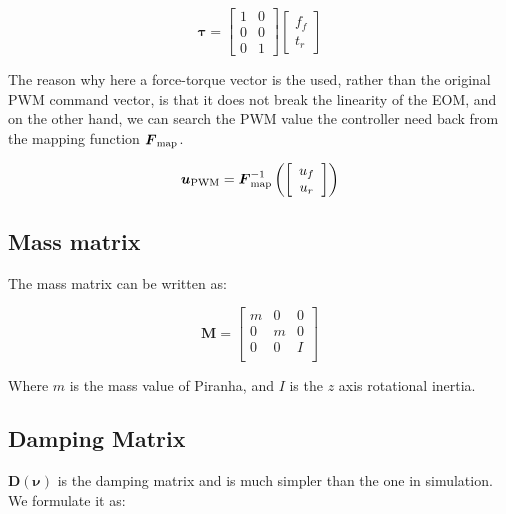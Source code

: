 \begin{equation}
    \boldsymbol{\tau}=\left[\begin{array}{cc}
        1 & 0 \\
        0 & 0\\
        0 & 1 
    \end{array}\right]\left[\begin{array}{c}
        f_f  \\
        t_r
    \end{array}\right]
\end{equation}

The reason why here a force-torque vector is the used, rather than the original PWM command vector, is that it does not break the linearity of the EOM, and on the other hand, we can search the PWM value the controller need back from the mapping function $\boldsymbol{F}_{\rm map}$. 

\begin{equation}
    \boldsymbol{u}_{\rm PWM}=\boldsymbol{F}_{\rm map}^{-1}\left(\left[\begin{array}{c}
        u_f  \\
        u_r
    \end{array}\right]\right)
\end{equation}

\subsection{Mass matrix}

The mass matrix can be written as:

\begin{equation}
    \boldsymbol{M}=\left[\begin{array}{ccc}
        m & 0 & 0 \\
        0 & m & 0 \\
        0 & 0 & I \\
    \end{array}\right]
\end{equation}

Where $m$ is the mass value of Piranha, and $I$ is the $z$ axis rotational inertia.

\subsection{Damping Matrix}

$\boldsymbol{D}(\boldsymbol{\nu})$ is the damping matrix and is much simpler than the one in simulation. We formulate it as:

